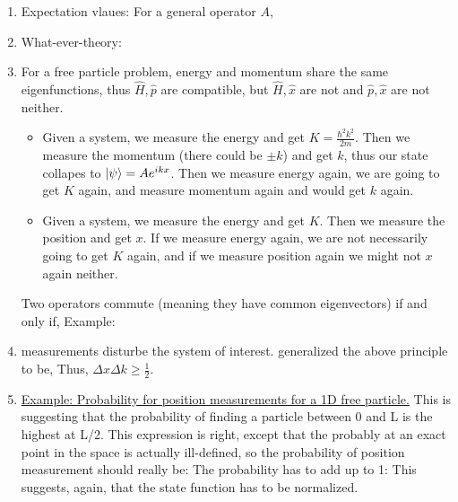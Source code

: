 \documentclass{school-22.101-notes}
\begin{document}
\begin{enumerate}
\item Expectation vlaues: 
  For a general operator $A$, 

\item What-ever-theory: 


\item For a free particle problem, energy and momentum share the same eigenfunctions, thus $\hat{H}, \hat{p}$ are compatible, but $\hat{H}, \hat{x}$ are not and $\hat{p}, \hat{x}$ are not neither. 
  \begin{itemize}
    \item Given a system, we measure the energy and get $K = \frac{\hbar^2 k^2}{2m}$. Then we measure the momentum (there could be $\pm k$) and get $k$, thus our state collapes to $\left| \psi \right> = A e^{ikx}$. Then we measure energy again, we are going to get $K$ again, and measure momentum again and would get $k$ again. 
    \item Given a system, we measure the energy and get $K$. Then we measure the position and get $x$. If we measure energy again, we are not necessarily going to get $K$ again, and if we measure position again we might not $x$ again neither. 
  \end{itemize}
  Two operators commute (meaning they have common eigenvectors) if and only if, 
  Example: 

\item {} measurements disturbe the system of interest. 
   generalized the above principle to be, 
  Thus, $\Delta x \Delta k \ge \frac{1}{2}$. 


\item \uline{Example: Probability for position measurements for a 1D free particle.} 
This is suggesting that the probability of finding a particle between 0 and L is the highest at L/2. This expression is right, except that the probably at an exact point in the space is actually ill-defined, so the probability of position measurement should really be:
The probability has to add up to 1: 
This suggests, again, that the state function has to be normalized. 


\end{enumerate}
\end{document}
